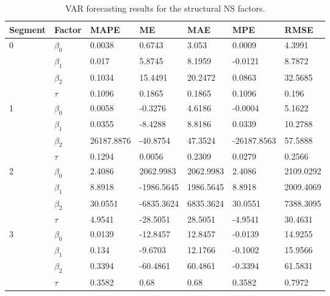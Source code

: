         \begin{table}[htbp]
            \centering
            \begin{tabular}{|l|l|l|l|l|l|l|}
            \hline
            Segment            & Factor    & MAPE       & ME       & MAE     & MPE         & RMSE    \\ \hline
            \multirow{4}{*}{0} & $\beta_0$ & 0.0038     & 0.6743   & 3.053   & 0.0009      & 4.3991  \\ \cline{2-7} 
                               & $\beta_1$ &  0.017    &  5.8745   &   8.1959   &  -0.0121    &   8.7872   \\ \cline{2-7} 
                               & $\beta_2$ &   0.1034   &   15.4491  &   20.2472   &   0.0863   &   32.5685   \\ \cline{2-7} 
                               & $\tau$    &  0.1096    &   0.1865  & 0.1865     &  0.1096    &   0.196   \\ \hline

            \multirow{4}{*}{1} & $\beta_0$ &  0.0058    &  -0.3276   &   4.6186   &  -0.0004    &  5.1622    \\ \cline{2-7} 
                               & $\beta_1$ &  0.0355    & -8.4288    &  8.8186    &  0.0339    &  10.2788    \\ \cline{2-7} 
                               & $\beta_2$ &  26187.8876    &  -40.8754   &  47.3524    &  -26187.8563    & 57.5888     \\ \cline{2-7} 
                               & $\tau$    &  0.1294    &  0.0056   &  0.2309    &  0.0279    &  0.2566    \\ \hline

            \multirow{4}{*}{2} & $\beta_0$ &  2.4086    & 2062.9983    & 2062.9983     & 2.4086     &  2109.0292    \\ \cline{2-7} 
                               & $\beta_1$ &  8.8918    & -1986.5645    & 1986.5645     & 8.8918     &  2009.4069    \\ \cline{2-7} 
                               & $\beta_2$ &  30.0551    & -6835.3624    & 6835.3624     & 30.0551     & 7388.3095     \\ \cline{2-7} 
                               & $\tau$    &  4.9541    &  -28.5051   &  28.5051    &  -4.9541    & 30.4631     \\ \hline

            \multirow{4}{*}{3} & $\beta_0$ & 0.0139     & -12.8457    & 12.8457     &  -0.0139    & 14.9255     \\ \cline{2-7} 
                               & $\beta_1$ & 0.134     & -9.6703    &  12.1766    &  -0.1002    &  15.9566    \\ \cline{2-7} 
                               & $\beta_2$ &  0.3394    & -60.4861    & 60.4861     &  -0.3394    &  61.5831    \\ \cline{2-7} 
                               & $\tau$    &  0.3582    &  0.68   &  0.68    & 0.3582     &  0.7972    \\ \hline
            \end{tabular}
            \caption{VAR forecasting results for the structural NS factors.}
            \label{tab:structuralVAR}
        \end{table}